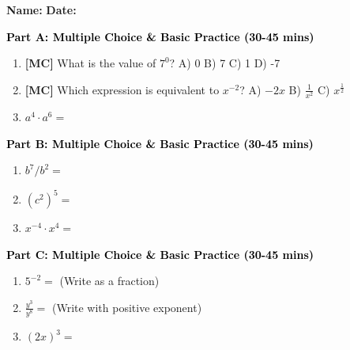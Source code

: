 \documentclass[12pt, letterpaper, fleqn]{article}
\newcommand{\blank}{\underline{\hspace{2.2cm}}}
\begin{document}
\textbf{Name:} \underline{\hspace{5cm}}
\hfill
\textbf{Date:} \underline{\hspace{3cm}}\\


\begin{tcolorbox}[colback=customteal!20]
\large\textcolor{black}{\textbf{Part A: Multiple Choice \& Basic Practice (30-45 mins)}}
\end{tcolorbox}

\vspace{3mm}

\begin{enumerate}[itemsep=2.5cm, leftmargin=0.6cm]
\item \textbf{[MC]} What is the value of $7^0$?
A) 0 \quad B) 7 \quad C) 1 \quad D) -7
\item \textbf{[MC]} Which expression is equivalent to $x^{-2}$?
A) $-2x$ \quad B) $\frac{1}{x^2}$ \quad C) $x^{\frac{1}{2}}$
\item $a^4 \cdot a^6 = $ \blank
\end{enumerate}

\newpage

\begin{tcolorbox}[colback=customteal!20]
\large\textcolor{black}{\textbf{Part B: Multiple Choice \& Basic Practice (30-45 mins)}}
\end{tcolorbox}

\vspace{3mm}

\begin{enumerate}[itemsep=2.5cm, leftmargin=0.6cm, resume]
\item $b^7 / b^2 = $ \blank
\item $(c^2)^5 = $ \blank
\item $x^{-4} \cdot x^4 = $ \blank
\end{enumerate}

\newpage

\begin{tcolorbox}[colback=customteal!20]
\large\textcolor{black}{\textbf{Part C: Multiple Choice \& Basic Practice (30-45 mins)}}
\end{tcolorbox}

\vspace{3mm}

\begin{enumerate}[itemsep=2.5cm, leftmargin=0.6cm, resume]
\item $5^{-2} = $ \blank (Write as a fraction)
\item $\frac{y^3}{y^8} = $ \blank (Write with positive exponent)
\item $(2x)^3 = $ \blank
\end{enumerate}
\end{document}
